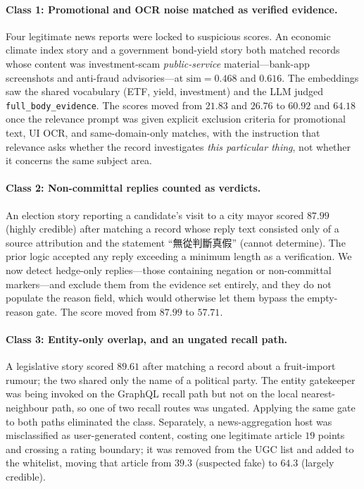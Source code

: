 \documentclass[twoside]{llncs}
\newcommand{\zh}[1]{{\CJKfamily{zh}#1}}
\begin{document}
\paragraph{Class 1: Promotional and OCR noise matched as verified evidence.}
Four legitimate news reports were locked to suspicious scores. An economic climate index story and a government bond-yield story both matched records whose content was investment-scam \emph{public-service} material---bank-app screenshots and anti-fraud advisories---at $\text{sim} = 0.468$ and $0.616$. The embeddings saw the shared vocabulary (ETF, yield, investment) and the LLM judged \texttt{full\_body\_evidence}. The scores moved from $21.83$ and $26.76$ to $60.92$ and $64.18$ once the relevance prompt was given explicit exclusion criteria for promotional text, UI OCR, and same-domain-only matches, with the instruction that relevance asks whether the record investigates \emph{this particular thing}, not whether it concerns the same subject area.

\paragraph{Class 2: Non-committal replies counted as verdicts.}
An election story reporting a candidate's visit to a city mayor scored $87.99$ (highly credible) after matching a record whose reply text consisted only of a source attribution and the statement ``\zh{無從判斷真假}'' (cannot determine). The prior logic accepted any reply exceeding a minimum length as a verification. We now detect hedge-only replies---those containing negation or non-committal markers---and exclude them from the evidence set entirely, and they do not populate the reason field, which would otherwise let them bypass the empty-reason gate. The score moved from $87.99$ to $57.71$.

\paragraph{Class 3: Entity-only overlap, and an ungated recall path.}
A legislative story scored $89.61$ after matching a record about a fruit-import rumour; the two shared only the name of a political party. The entity gatekeeper was being invoked on the GraphQL recall path but not on the local nearest-neighbour path, so one of two recall routes was ungated. Applying the same gate to both paths eliminated the class. Separately, a news-aggregation host was misclassified as user-generated content, costing one legitimate article $19$ points and crossing a rating boundary; it was removed from the UGC list and added to the whitelist, moving that article from $39.3$ (suspected fake) to $64.3$ (largely credible).
\end{document}
